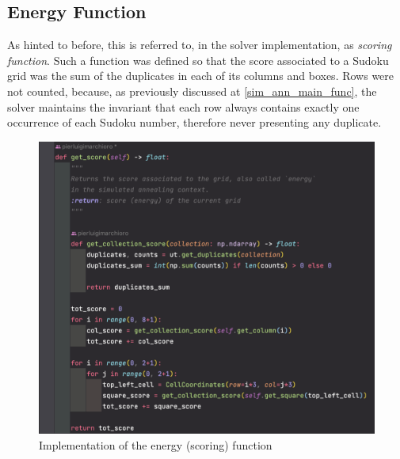 \subsection{Energy Function}

As hinted to before, this is referred to, in the solver implementation, as \textit{scoring function}. Such a function was defined so that the score associated to a Sudoku grid was the sum of the duplicates in each of its columns and boxes. Rows were not counted, because, as previously discussed at \ref{sim_ann_main_func}, the solver maintains the invariant that each row always contains exactly one occurrence of each Sudoku number, therefore never presenting any duplicate.

\begin{figure}[h]
    \centering
    \includegraphics[scale=0.65]{assignment-1/images/sim_ann/energy-1-get_score.png}
    \caption{Implementation of the energy (scoring) function}
    \label{fig:ann_energy_1_get_score}
\end{figure}